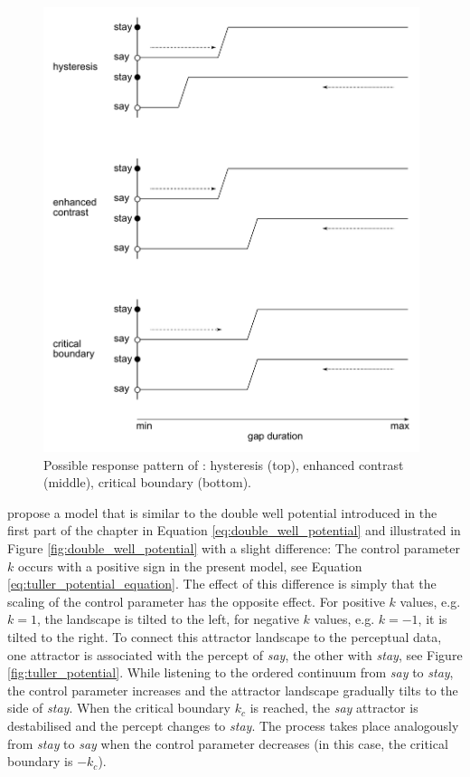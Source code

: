\begin{figure}[t]
\includegraphics[width=11cm]{figures/ch3/tuller_etal_1994_response_patterns.pdf}
\caption[Possible response patterns of \citet{Tulleretal1994}.]{Possible response pattern of \citet{Tulleretal1994}: hysteresis (top), enhanced contrast (middle), critical boundary (bottom).}
\label{fig:tuller_response}
\end{figure}

\citet{Tulleretal1994} propose a model that is similar to the double well potential introduced in the first part of the chapter in Equation \ref{eq:double_well_potential} and illustrated in Figure \ref{fig:double_well_potential} with a slight difference: The control parameter $k$ occurs with a positive sign in the present model, see Equation \ref{eq:tuller_potential_equation}. The effect of this difference is simply that the scaling of the control parameter has the opposite effect. For positive $k$ values, e.g. $k = 1$, the landscape is tilted to the left, for negative $k$ values, e.g. $k = -1$, it is tilted to the right. 
To connect this attractor landscape to the perceptual data, one attractor is associated with the percept of \emph{say}, the other with \emph{stay}, see Figure \ref{fig:tuller_potential}. While listening to the ordered continuum from \emph{say} to \emph{stay}, the control parameter increases and the attractor landscape gradually tilts to the side of \emph{stay}. When the critical boundary $k_c$ is reached, the \emph{say} attractor is destabilised and the percept changes to \emph{stay}. The process takes place analogously from \emph{stay} to \emph{say} when the control parameter decreases (in this case, the critical boundary is $-k_c$).

